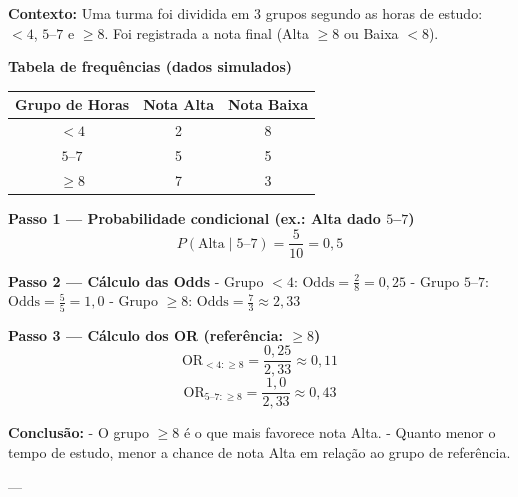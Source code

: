 \begin{SolvedBox}

\textbf{Contexto:} Uma turma foi dividida em 3 grupos segundo as horas de estudo: $<4$, $5$–$7$ e $\ge 8$. Foi registrada a nota final (Alta $\ge 8$ ou Baixa $<8$).  

\textbf{Tabela de frequências (dados simulados)}  

\begin{center}
\begin{tabular}{@{}c|c|c@{}}\toprule
Grupo de Horas & Nota Alta & Nota Baixa \\\midrule
$<4$       & 2 & 8 \\
$5$–$7$    & 5 & 5 \\
$\ge 8$    & 7 & 3 \\\bottomrule
\end{tabular}
\end{center}

\textbf{Passo 1 — Probabilidade condicional (ex.: Alta dado $5$–$7$)}  
\[
P(\text{Alta}\mid 5\text{–}7) = \frac{5}{10} = 0,5
\]

\textbf{Passo 2 — Cálculo das Odds}  
- Grupo $<4$: $\mathrm{Odds}=\frac{2}{8}=0,25$  
- Grupo $5$–$7$: $\mathrm{Odds}=\frac{5}{5}=1,0$  
- Grupo $\ge 8$: $\mathrm{Odds}=\frac{7}{3}\approx 2,33$

\textbf{Passo 3 — Cálculo dos OR (referência: $\ge 8$)}  
\[
\mathrm{OR}_{<4:\ge 8} = \frac{0,25}{2,33}\approx 0,11
\]
\[
\mathrm{OR}_{5\text{–}7:\ge 8} = \frac{1,0}{2,33}\approx 0,43
\]

\textbf{Conclusão:}  
- O grupo $\ge 8$ é o que mais favorece nota Alta.  
- Quanto menor o tempo de estudo, menor a chance de nota Alta em relação ao grupo de referência.
\end{SolvedBox}


---

